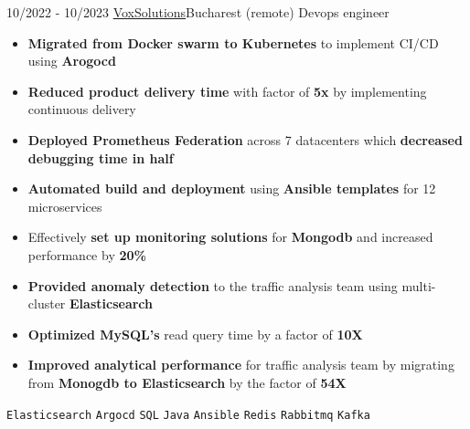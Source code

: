 \documentclass[9pt]{developercv} %
\begin{document}
\begin{entrylist}
    \entry
    {10/2022 - 10/2023}
    {\href{https://voxsolutions.co/}{VoxSolutions}\newline\small\textnormal{Bucharest (remote)}}
    {Devops engineer}
    {\vspace{-6pt}
    \begin{itemize}[itemsep=2pt,topsep=0pt,parsep=0pt,partopsep=0pt, leftmargin=-1pt]
        \item{\textbf{Migrated from Docker swarm to Kubernetes} to implement CI/CD using \textbf{Arogocd}}
        \item{\textbf{Reduced product delivery time} with factor of \textbf{5x} by implementing continuous delivery}
        \item{\textbf{Deployed Prometheus Federation} across 7 datacenters which \textbf{decreased debugging time in half}}
        \item{\textbf{Automated build and deployment} using \textbf{Ansible templates} for 12 microservices}
        \item{Effectively \textbf{set up monitoring solutions} for \textbf{Mongodb} and increased performance by \textbf{20\%}}
        \item{\textbf{Provided anomaly detection} to the traffic analysis team using multi-cluster \textbf{Elasticsearch}}
        \item{\textbf{Optimized MySQL's} read query time by a factor of \textbf{10X}}
        \item{\textbf{Improved analytical performance}  for traffic analysis team by migrating from \textbf{Monogdb to Elasticsearch} by the factor of \textbf{54X}}
    \end{itemize}
    {\vspace{2pt}}
    \texttt{Elasticsearch} \slashsep \texttt{Argocd} \slashsep \texttt{SQL} \slashsep \texttt{Java} \slashsep \texttt{Ansible} \slashsep \texttt{Redis} \slashsep \texttt{Rabbitmq} \slashsep \texttt{Kafka}}
\end{entrylist}
\begin{center}
    \hdashrule[0.2ex]{\linewidth}{0.5pt}{.8mm}
\end{center}
\vspace{5pt}
\end{document}
